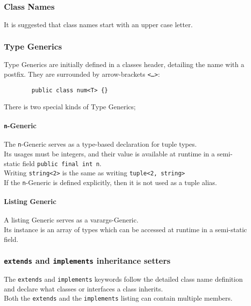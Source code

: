 \documentclass{docs}
\begin{document}
    \subsubsection{Class Names}
    It is suggested that class names start with an upper case letter.
    
    \subsubsection{Type Generics}
    Type Generics are initially defined in a classes header, detailing the name with a postfix.
    They are surrounded by arrow-brackets \texttt{<\dots>}:
    \begin{verbatim}
        public class num<T> {}
    \end{verbatim}
    There is two special kinds of Type Generics;
    
    \label{typeGenN}
    \paragraph{\texttt{n}-Generic} The \texttt{n}-Generic serves as a type-based declaration for tuple types. \\
    Its usages must be integers, and their value is available at runtime in a semi-static field \texttt{public final int n}. \\
    Writing \texttt{string<2>} is the same as writing \texttt{tuple<2, string>} \\
    If the \texttt{n}-Generic is defined explicitly, then it is not used as a tuple alias.
    
    \label{typeGenList}
    \paragraph{Listing Generic} A listing Generic serves as a varargs-Generic. \\
    Its instance is an array of types which can be accessed at runtime in a semi-static field.
    
    \subsubsection{\texttt{extends} and \texttt{implements} inheritance setters}
    The \texttt{extends} and \texttt{implements} keywords follow the detailed class name definition and declare what classes or interfaces a class inherits. \\
    Both the \texttt{extends} and the \texttt{implements} listing can contain multiple members.
    
\end{document}
